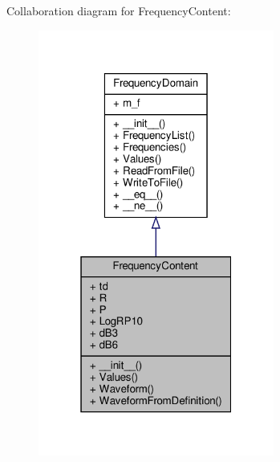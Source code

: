 Collaboration diagram for Frequency\+Content\+:
\nopagebreak
\begin{figure}[H]
\begin{center}
\leavevmode
\includegraphics[width=220pt]{classSignalIntegrity_1_1FrequencyDomain_1_1FrequencyContent_1_1FrequencyContent__coll__graph}
\end{center}
\end{figure}
